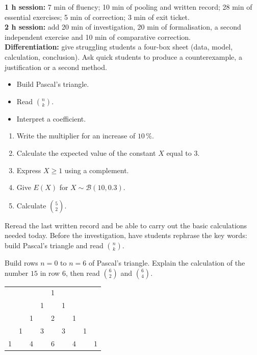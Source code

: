 \ifprof
\begin{methode}
\textbf{1 h session:} 7 min of fluency; 10 min of pooling and written record; 28 min of essential exercises; 5 min of correction; 3 min of exit ticket.\\
\textbf{2 h session:} add 20 min of investigation, 20 min of formalisation, a second independent exercise and 10 min of comparative correction.\\
\textbf{Differentiation:} give struggling students a four-box sheet (data, model, calculation, conclusion). Ask quick students to produce a counterexample, a justification or a second method.
\end{methode}
\fi
{}
\begin{objectifs}\begin{itemize}\item Build Pascal's triangle.\item Read $\binom nk$.\item Interpret a coefficient.\end{itemize}\end{objectifs}
\begin{automatismes}\begin{enumerate}\item Write the multiplier for an increase of $10\,\%$. \item Calculate the expected value of the constant $X$ equal to $3$. \item Express $X\geq1$ using a complement. \item Give $E(X)$ for $X\sim\mathcal B(10,0.3)$. \item Calculate $\binom52$. \end{enumerate}\end{automatismes}
\begin{prerequis}Reread the last written record and be able to carry out the basic calculations needed today. Before the investigation, have students rephrase the key words: build Pascal's triangle and read $\binom nk$.\end{prerequis}

\begin{activite}
Build rows $n=0$ to $n=6$ of Pascal's triangle. Explain the calculation of the number $15$ in row $6$, then read $\binom62$ and $\binom64$.
\begin{center}\begin{tabular}{*{9}{c}}&&&&1&&&&\\&&&1&&1&&&\\&&1&&2&&1&&\\&1&&3&&3&&1&\\1&&4&&6&&4&&1\end{tabular}\end{center}
\end{activite}

